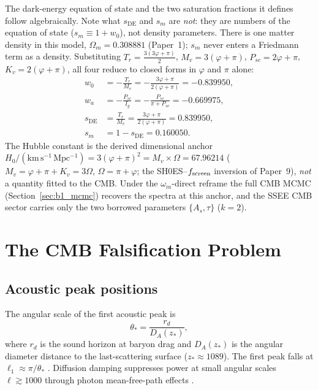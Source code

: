 \documentclass[12pt,a4paper]{article}
\begin{document}
The dark-energy equation of state and the two saturation fractions it defines
follow algebraically. Note what $s_{\mathrm{DE}}$ and $s_m$ are \emph{not}:
they are numbers of the equation of state ($s_m\equiv1+w_0$), not density
parameters. There is one matter density in this model, $\Omega_m=0.308881$
(Paper~1); $s_m$ never enters a Friedmann term as a density.
Substituting $T_r=\tfrac{3(3\varphi+\pi)}{2}$, $M_v=3(\varphi+\pi)$,
$P_{sc}=2\varphi+\pi$, $K_v=2(\varphi+\pi)$, all four reduce to
closed forms in $\varphi$ and $\pi$ alone:
\begin{align}
w_0 &= -\frac{T_r}{M_v} = -\frac{3\varphi+\pi}{2(\varphi+\pi)} = -0.839950, \label{eq:w0}\\
w_a &= -\frac{P_{sc}}{I_g} = -\frac{P_{sc}}{\pi+P_{sc}} = -0.669975, \label{eq:wa}\\
s_{\mathrm{DE}} &= \frac{T_r}{M_v} = \frac{3\varphi+\pi}{2(\varphi+\pi)} = 0.839950, \label{eq:sDE}\\
s_m &= 1 - s_{\mathrm{DE}} = 0.160050. \label{eq:sm}
\end{align}
The Hubble constant is the derived dimensional anchor
$H_0/(\mathrm{km\,s^{-1}\,Mpc^{-1}}) = 3(\varphi+\pi)^2 = M_v\times\Omega = 67.96214$
($M_v=\varphi+\pi+K_v=3\Omega$, $\Omega=\pi+\varphi$; the SH0ES--$f_{\rm screen}$
inversion of Paper~9), \emph{not} a quantity fitted to the CMB. Under the
$\omega_m$-direct reframe the full CMB MCMC (Section~\ref{sec:b1_mcmc})
recovers the spectra at this anchor, and the SSEE CMB sector carries only the
two borrowed parameters $\{A_s,\tau\}$ ($k=2$).

\section{The CMB Falsification Problem}
\label{sec:problem}

\subsection{Acoustic peak positions}

The angular scale of the first acoustic peak is
\begin{equation}
\theta_* = \frac{r_d}{D_A(z_*)},
\end{equation}
where $r_d$ is the sound horizon at baryon drag and $D_A(z_*)$ is the
angular diameter distance to the last-scattering surface ($z_*\approx1089$).
The first peak falls at $\ell_1 \approx \pi/\theta_*$ \citep{HuSugiyama1996,Dodelson2003}.
Diffusion damping suppresses power at small angular scales
$\ell\gtrsim1000$ through photon mean-free-path effects \citep{Silk1968}.
\end{document}

